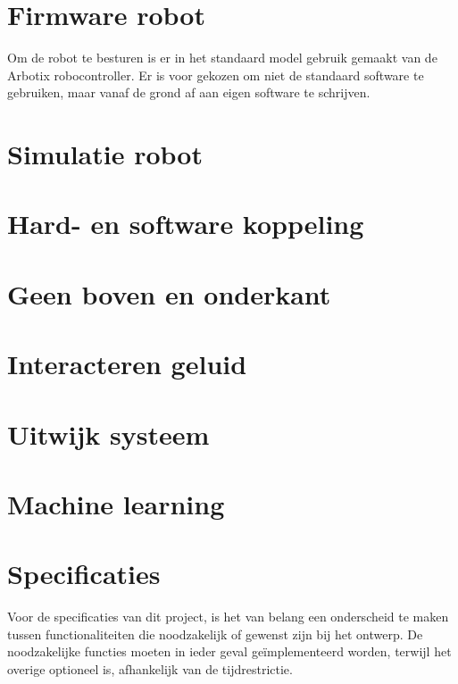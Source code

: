 \documentclass[10pt,a4paper]{article}
\begin{document}
\section{Firmware robot}
Om de robot te besturen is er in het standaard model gebruik gemaakt van de Arbotix robocontroller. 
Er is voor gekozen om niet de standaard software te gebruiken, maar vanaf de grond af aan eigen software te schrijven.

\section{Simulatie robot}
\section{Hard- en software koppeling}
\section{Geen boven en onderkant}
\section{Interacteren geluid}
\section{Uitwijk systeem}
\section{Machine learning}

\fi

\section{Specificaties}

Voor de specificaties van dit project, is het van belang een onderscheid te maken tussen functionaliteiten die noodzakelijk of gewenst zijn bij het ontwerp. De noodzakelijke functies moeten in ieder geval ge\"implementeerd worden, terwijl het overige optioneel is, afhankelijk van de tijdrestrictie.
\end{document}
